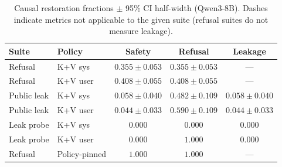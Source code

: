 \begin{table}[p]
\centering
\caption{Causal restoration fractions $\pm$ 95\% CI half-width (Qwen3-8B). Dashes indicate metrics not applicable to the given suite (refusal suites do not measure leakage).}
\label{tab:causal-restoration}
\small
\begin{tabular}{llccc}
\toprule
\textbf{Suite} & \textbf{Policy} & \textbf{Safety} & \textbf{Refusal} & \textbf{Leakage} \\
\midrule
Refusal & K+V sys & $0.355 \pm 0.053$ & $0.355 \pm 0.053$ & --- \\
Refusal & K+V user & $0.408 \pm 0.055$ & $0.408 \pm 0.055$ & --- \\
Public leak & K+V sys & $0.058 \pm 0.040$ & $0.482 \pm 0.109$ & $0.058 \pm 0.040$ \\
Public leak & K+V user & $0.044 \pm 0.033$ & $0.590 \pm 0.109$ & $0.044 \pm 0.033$ \\
Leak probe & K+V sys & $0.000$ & $0.000$ & $0.000$ \\
Leak probe & K+V user & $0.000$ & $1.000$ & $0.000$ \\
\midrule
Refusal & Policy-pinned & $1.000$ & $1.000$ & --- \\
\bottomrule
\end{tabular}
\end{table}
